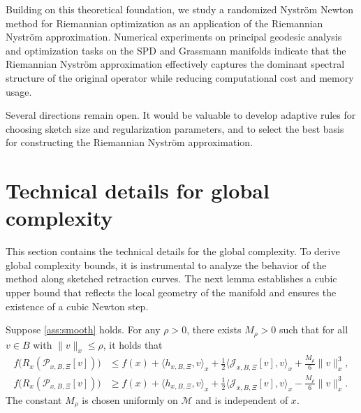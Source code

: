 \documentclass[final,onefignum,onetabnum]{siamart250211}
\begin{document}
Building on this theoretical foundation, we study a randomized Nystr\"om Newton method for Riemannian optimization as an application of the Riemannian Nystr\"om approximation. Numerical experiments on principal geodesic analysis and optimization tasks on the SPD and Grassmann manifolds indicate that the Riemannian Nystr\"om approximation effectively captures the dominant spectral structure of the original operator while reducing computational cost and memory usage.

Several directions remain open. It would be valuable to develop adaptive rules for choosing sketch size and regularization parameters, and to select the best basis for constructing the Riemannian Nystr\"om approximation.


  

\appendix


\section{Technical details for global complexity}
\label{app:global-complexity}
This section contains the technical details for the global complexity.
To derive global complexity bounds, it is instrumental to analyze the behavior of the method along sketched retraction curves. The next lemma establishes a cubic upper bound that reflects the local geometry of the manifold and ensures the existence of a cubic Newton step.

\begin{lemma}\label{lem:retraction-cubic-upper}
 Suppose \cref{ass:smooth} holds. For any $\rho > 0$, there exists $M_\rho>0$ such that for all $v\in B$ with $\|v\|_x\le \rho$, it holds that
  \begin{equation}
  \label{eq:retraction-cubic-upper-bound}
  \begin{aligned}
  f\big(R_x(\mathcal{P}_{x, B, \Xi} [v])\big) &\le f(x)+\langle h_{x, B, \Xi},v\rangle_x+\tfrac{1}{2}\langle \mathcal{J}_{x, B, \Xi} [v],v\rangle_x+\tfrac{M_\rho}{6}\|v\|_x^{3} ,\\
  f\big(R_x(\mathcal{P}_{x, B, \Xi} [v])\big) &\ge f(x)+\langle h_{x, B, \Xi},v\rangle_x+\tfrac{1}{2}\langle \mathcal{J}_{x, B, \Xi} [v],v\rangle_x - \tfrac{M_\rho}{6}\|v\|_x^{3}.
  \end{aligned}
  \end{equation}
   The constant $M_\rho$ is chosen uniformly on $\mathcal{M}$ and is independent of $x$.
  \end{lemma}
\end{document}
